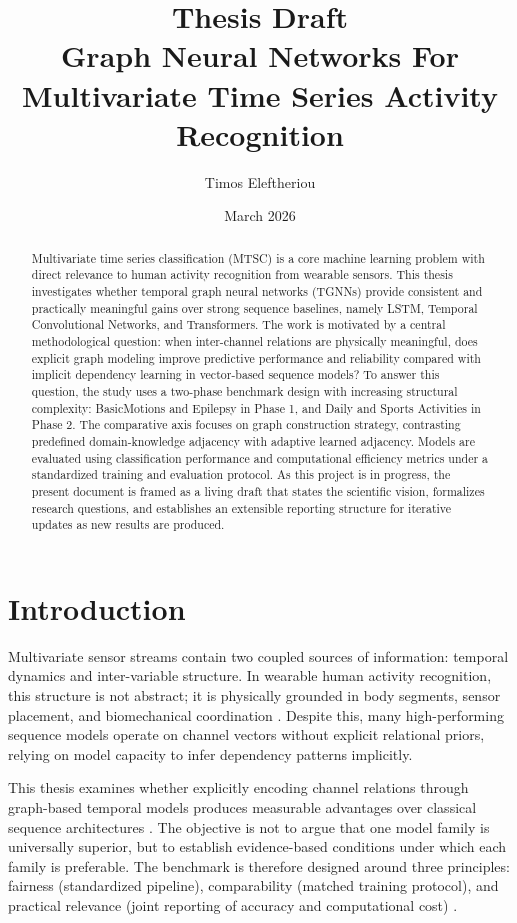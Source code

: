 \documentclass[11pt,a4paper]{article}
\title{\textbf{Thesis Draft}\\
Graph Neural Networks For Multivariate Time Series Activity Recognition}
\author{Timos Eleftheriou}
\date{March 2026}
\begin{document}
\maketitle

\begin{abstract}
Multivariate time series classification (MTSC) is a core machine learning problem with direct relevance to human activity recognition from wearable sensors. This thesis investigates whether temporal graph neural networks (TGNNs) provide consistent and practically meaningful gains over strong sequence baselines, namely LSTM, Temporal Convolutional Networks, and Transformers. The work is motivated by a central methodological question: when inter-channel relations are physically meaningful, does explicit graph modeling improve predictive performance and reliability compared with implicit dependency learning in vector-based sequence models? To answer this question, the study uses a two-phase benchmark design with increasing structural complexity: BasicMotions and Epilepsy in Phase 1, and Daily and Sports Activities in Phase 2. The comparative axis focuses on graph construction strategy, contrasting predefined domain-knowledge adjacency with adaptive learned adjacency. Models are evaluated using classification performance and computational efficiency metrics under a standardized training and evaluation protocol. As this project is in progress, the present document is framed as a living draft that states the scientific vision, formalizes research questions, and establishes an extensible reporting structure for iterative updates as new results are produced.
\end{abstract}

\newpage
\section{Introduction}
Multivariate sensor streams contain two coupled sources of information: temporal dynamics and inter-variable structure. In wearable human activity recognition, this structure is not abstract; it is physically grounded in body segments, sensor placement, and biomechanical coordination \citep{altun2010har,uci_dsa}. Despite this, many high-performing sequence models operate on channel vectors without explicit relational priors, relying on model capacity to infer dependency patterns implicitly.

This thesis examines whether explicitly encoding channel relations through graph-based temporal models produces measurable advantages over classical sequence architectures \citep{battaglia2018relational,wu2019graphwavenet}. The objective is not to argue that one model family is universally superior, but to establish evidence-based conditions under which each family is preferable. The benchmark is therefore designed around three principles: fairness (standardized pipeline), comparability (matched training protocol), and practical relevance (joint reporting of accuracy and computational cost) \citep{dau2019ucr}.
\end{document}
